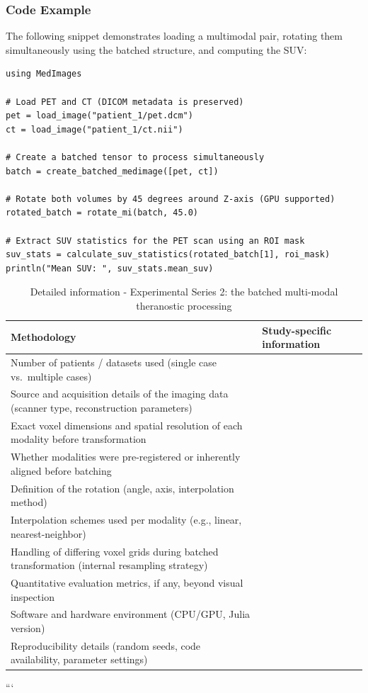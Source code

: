 \documentclass[a4paper,10pt]{elsarticle}
\begin{document}
\subsubsection*{Code Example}
The following snippet demonstrates loading a multimodal pair, rotating them simultaneously using the batched structure, and computing the SUV:

\begin{lstlisting}[basicstyle=\ttfamily\footnotesize]
using MedImages

# Load PET and CT (DICOM metadata is preserved)
pet = load_image("patient_1/pet.dcm")
ct = load_image("patient_1/ct.nii")

# Create a batched tensor to process simultaneously
batch = create_batched_medimage([pet, ct])

# Rotate both volumes by 45 degrees around Z-axis (GPU supported)
rotated_batch = rotate_mi(batch, 45.0)

# Extract SUV statistics for the PET scan using an ROI mask
suv_stats = calculate_suv_statistics(rotated_batch[1], roi_mask)
println("Mean SUV: ", suv_stats.mean_suv)
\end{lstlisting}

\begin{table}[H]
\centering
\caption{Detailed information  - Experimental Series 2: the batched multi-modal theranostic processing}
\label{tab:method_info_batched_Lu177}
\begin{tabular}{|p{}|p{}|}
\hline
\textbf{Methodology}& \textbf{Study-specific information} \\
\hline
Number of patients / datasets used (single case vs.\ multiple cases) & \\
\hline
Source and acquisition details of the imaging data (scanner type, reconstruction parameters) & \\
\hline
Exact voxel dimensions and spatial resolution of each modality before transformation & \\
\hline
Whether modalities were pre-registered or inherently aligned before batching & \\
\hline
Definition of the rotation (angle, axis, interpolation method) & \\
\hline
Interpolation schemes used per modality (e.g., linear, nearest-neighbor) & \\
\hline
Handling of differing voxel grids during batched transformation (internal resampling strategy) & \\
\hline
Quantitative evaluation metrics, if any, beyond visual inspection & \\
\hline
Software and hardware environment (CPU/GPU, Julia version) & \\
\hline
Reproducibility details (random seeds, code availability, parameter settings) & \\
\hline
\end{tabular}
\end{table}
```
\end{document}
